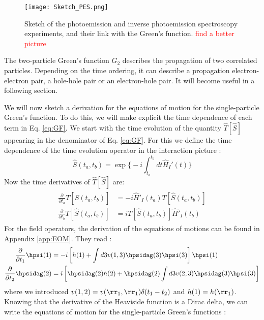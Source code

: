 \begin{figure}[h!tbp]
	\vspace{0.5cm}
	\setcapindent{2em}
	\centering
	\texttt{[image: Sketch\_PES.png]}
	\caption{Sketch of the photoemission and inverse photoemission spectroscopy experiments, and their link with the Green's function. \textcolor{red}{find a better picture}}
	\label{fig:sketch_PES}
\end{figure}
The two-particle Green's function $G_2$ describes the propagation of two correlated particles. Depending on the time ordering, it can describe a propagation electron-electron pair, a hole-hole pair or an electron-hole pair. It will become useful in a following section.
%

We will now sketch a derivation for the equations of motion for the single-particle Green's function. To do this, we will make explicit the time dependence of each term in Eq. \eqref{eq:GF}.
We start with the time evolution of the quantity $\hat{T}[\hat{S}]$ appearing in the denominator of Eq. \ref{eq:GF}.
For this we define the time dependence of the time evolution operator in the interaction picture :
\begin{equation}
	\hat{S}(t_a,t_b) = \exp	\biggl\{ -i \int_{t_a}^{t_b} dt \hat{H}_I'(t) \biggr\}
\end{equation}
Now the time derivatives of $\hat{T}[\hat{S}]$ are:
\begin{align}
\begin{split}
	\frac{\partial}{\partial t_a} T[\hat{S}(t_a,t_b)] &= -i \hat{H}'_I(t_a)T[\hat{S}(t_a,t_b)] \\
	\frac{\partial}{\partial t_b} T[\hat{S}(t_a,t_b)] &= i T[\hat{S}(t_a,t_b)]\hat{H}'_I(t_b)
\end{split}
\end{align}
For the field operators, the derivation of the equations of motions can be found in Appendix \ref{app:EOM}. They read :
\begin{align}
\begin{split}
	\frac{\partial}{\partial t_1} \hpsi(1) &= -i \left[ h(1) + \int d3 v(1,3) \hpsidag(3)\hpsi(3) \right] \hpsi(1) \\
	\frac{\partial}{\partial t_2} \hpsidag(2) &= i \left[ \hpsidag(2)h(2) + \hpsidag(2) \int d3 v(2,3) \hpsidag(3)\hpsi(3) \right]
\end{split}	
\end{align}
where we introduced $v(1,2) = v(\rr_1,\rr_1)\delta(t_1-t_2)$ and $h(1)=h(\rr_1)$. Knowing that the derivative of the Heaviside function is a Dirac delta, we can write the equations of motion for the single-particle Green's functions :
